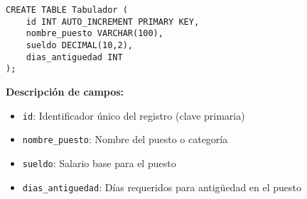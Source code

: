 \begin{lstlisting}
CREATE TABLE Tabulador (
    id INT AUTO_INCREMENT PRIMARY KEY,
    nombre_puesto VARCHAR(100),
    sueldo DECIMAL(10,2),
    dias_antiguedad INT
);
\end{lstlisting}

\textbf{Descripción de campos:}
\begin{itemize}
    \item \texttt{id}: Identificador único del registro (clave primaria)
    \item \texttt{nombre\_puesto}: Nombre del puesto o categoría
    \item \texttt{sueldo}: Salario base para el puesto
    \item \texttt{dias\_antiguedad}: Días requeridos para antigüedad en el puesto
\end{itemize}

